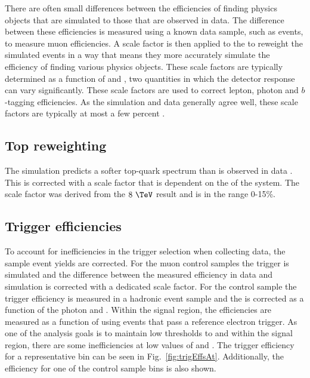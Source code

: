There are often small differences between the efficiencies of finding
physics objects that are simulated to those that are observed in data.
The difference between these efficiencies is measured using a known
data sample, such as \zmumu events, to measure muon efficiencies. A
scale factor is then applied to the \MC to reweight the simulated
events in a way that means they more accurately simulate the
efficiency of finding various physics objects. These scale factors are
typically determined as a function of \pT and \eta, two quantities in
which the detector response can vary significantly. These scale
factors are used to correct lepton, photon and $b$-tagging
efficiencies. As the simulation and data generally agree well, these
scale factors are typically at most a few percent \cite{CMS-DP-2017-007,CMS-DP-2016-042}.

\subsection{Top \pT reweighting}%

The \ttbar simulation predicts a softer top-quark \pT spectrum than is
observed in data \cite{topptrwt}. This is corrected with a scale factor that is
dependent on the \pT of the \ttbar system. The scale factor was
derived from the $8~\tev$ \LHC result and is in the range 0-15\%.

\subsection{Trigger efficiencies}

To account for inefficiencies in the trigger selection when collecting
data, the \MC sample event yields are corrected. For the muon control
samples the trigger is simulated and the difference between the
measured efficiency in data and simulation is corrected with a
dedicated scale factor. For the \gj control sample the trigger
efficiency is measured in a hadronic event sample and the \MC is
corrected as a function of the photon \pT and \eta. Within the signal
region, the efficiencies are measured as a function of \MHT using
events that pass a reference electron trigger. As one of the analysis goals
is to maintain low thresholds to \HT and \MHT within the signal
region, there are some inefficiencies at low values of \HT and \MHT.
The trigger efficiency for a representative bin can be seen in
Fig.~\ref{fig:trigEffsAt}. Additionally, the efficiency for one of the \gj control
sample bins is also shown.

